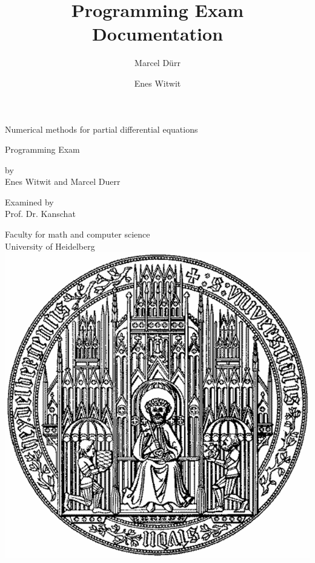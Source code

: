 \documentclass[a4paper,12pt]{article}
\begin{document}
\title{Programming Exam Documentation}

\author{Marcel Dürr \and Enes Witwit}

\pagestyle{empty}




\begin{titlepage}

\begin{center} 
{\Huge Numerical methods for partial differential equations}
\vspace*{1cm}

{\Large Programming Exam}
\vspace*{1.5cm}

by \\[0.5cm]

{\Large Enes Witwit and Marcel Duerr}
\vspace*{1.5cm}

Examined by  \\[0.5cm]
{\Large Prof. Dr. Kanschat}
\vspace*{3cm}

Faculty for math and computer science\\[0.5cm]
University of Heidelberg \\[0.8cm]
\includegraphics[scale=0.2]{hd-logo.jpg} 
\end{center}
\end{titlepage}
\end{document}
